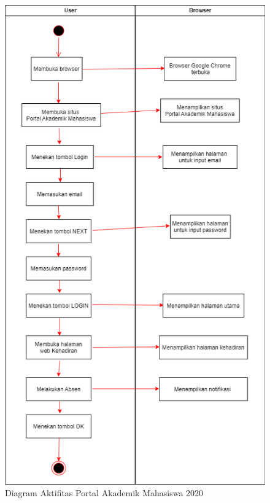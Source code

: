 \begin{figure}[H]
	\centering
	\includegraphics[scale=0.55]{Gambar/activityPAM.png}
	\caption{Diagram Aktifitas Portal Akademik Mahasiswa 2020} 
	\label{fig:acPAM}
\end{figure}

